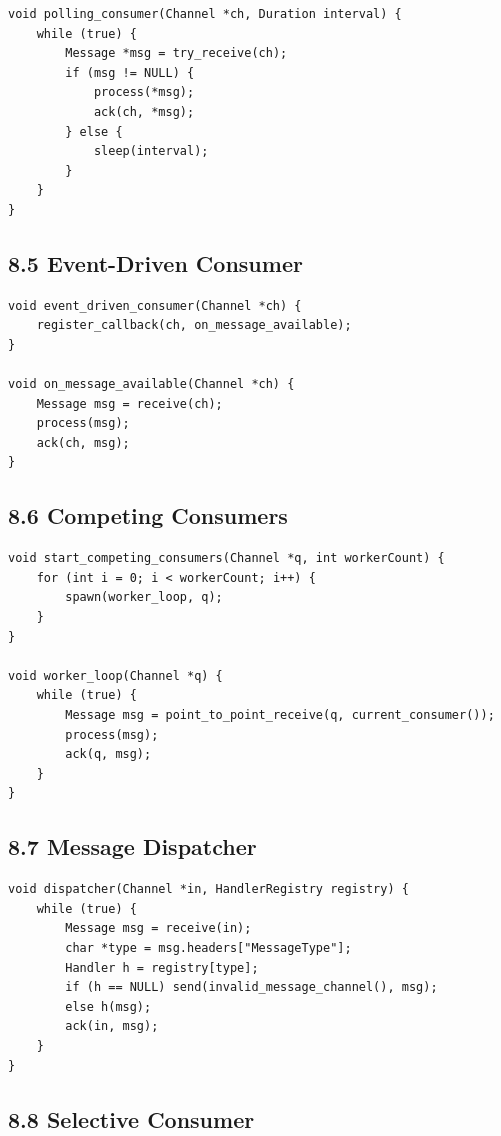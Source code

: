 \documentclass[11pt]{article}
\begin{document}
\begin{verbatim}
void polling_consumer(Channel *ch, Duration interval) {
    while (true) {
        Message *msg = try_receive(ch);
        if (msg != NULL) {
            process(*msg);
            ack(ch, *msg);
        } else {
            sleep(interval);
        }
    }
}
\end{verbatim}

\subsection{8.5 Event-Driven Consumer}\label{event-driven-consumer}

\begin{verbatim}
void event_driven_consumer(Channel *ch) {
    register_callback(ch, on_message_available);
}

void on_message_available(Channel *ch) {
    Message msg = receive(ch);
    process(msg);
    ack(ch, msg);
}
\end{verbatim}

\subsection{8.6 Competing Consumers}\label{competing-consumers}

\begin{verbatim}
void start_competing_consumers(Channel *q, int workerCount) {
    for (int i = 0; i < workerCount; i++) {
        spawn(worker_loop, q);
    }
}

void worker_loop(Channel *q) {
    while (true) {
        Message msg = point_to_point_receive(q, current_consumer());
        process(msg);
        ack(q, msg);
    }
}
\end{verbatim}

\subsection{8.7 Message Dispatcher}\label{message-dispatcher}

\begin{verbatim}
void dispatcher(Channel *in, HandlerRegistry registry) {
    while (true) {
        Message msg = receive(in);
        char *type = msg.headers["MessageType"];
        Handler h = registry[type];
        if (h == NULL) send(invalid_message_channel(), msg);
        else h(msg);
        ack(in, msg);
    }
}
\end{verbatim}

\subsection{8.8 Selective Consumer}\label{selective-consumer}
\end{document}

